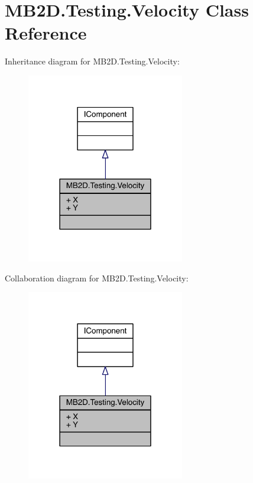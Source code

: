 \hypertarget{class_m_b2_d_1_1_testing_1_1_velocity}{}\section{M\+B2\+D.\+Testing.\+Velocity Class Reference}
\label{class_m_b2_d_1_1_testing_1_1_velocity}


Inheritance diagram for M\+B2\+D.\+Testing.\+Velocity\+:\nopagebreak
\begin{figure}[H]
\begin{center}
\leavevmode
\includegraphics[width=195pt]{class_m_b2_d_1_1_testing_1_1_velocity__inherit__graph}
\end{center}
\end{figure}


Collaboration diagram for M\+B2\+D.\+Testing.\+Velocity\+:\nopagebreak
\begin{figure}[H]
\begin{center}
\leavevmode
\includegraphics[width=195pt]{class_m_b2_d_1_1_testing_1_1_velocity__coll__graph}
\end{center}
\end{figure}
